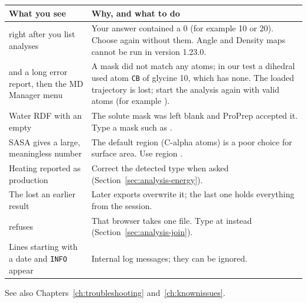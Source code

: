 \begin{tabularx}{\linewidth}{@{}lL@{}}
\toprule
\textbf{What you see} & \textbf{Why, and what to do} \\
\midrule
{} right after you list analyses &
  Your answer contained a 0 (for example 10 or 20). Choose again without
  them. Angle and Density maps cannot be run in version 1.23.0. \\
 and a long error report, then the MD Manager
  menu &
  A mask did not match any atoms; in our test a dihedral used atom
  \texttt{CB} of glycine 10, which has none. The loaded trajectory is lost;
  start the analysis again with valid atoms (for example
  ). \\
Water RDF with an empty  &
  The solute mask was left blank and ProPrep accepted it. Type a mask such as
  . \\
SASA gives a large, meaningless number &
  The default region (C-alpha atoms) is a poor choice for surface area. Use
  region . \\
Heating reported as production &
  Correct the detected type when asked (Section~\ref{sec:analysis-energy}). \\
The  lost an earlier result &
  Later exports overwrite it; the last one holds everything from the
  session. \\
 refuses  &
  That browser takes one file. Type  at  instead (Section~\ref{sec:analysis-join}). \\
Lines starting with a date and \texttt{INFO} appear &
  Internal log messages; they can be ignored. \\
\bottomrule
\end{tabularx}

\medskip
See also Chapters~\ref{ch:troubleshooting} and~\ref{ch:knownissues}.
